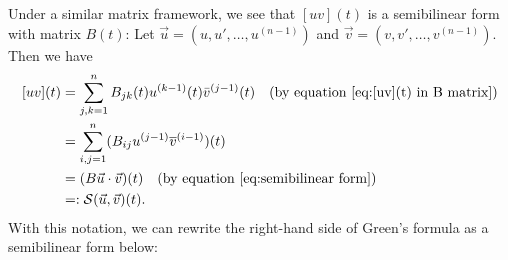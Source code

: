 \documentclass[11pt, oneside, a4paper]{article}
\begin{document}
Under a similar matrix framework, we see that $[uv](t)$ is a semibilinear form with matrix $B(t)$: Let $\vec{u}=(u, u', \ldots, u^{(n-1)})$ and $\vec{v}=(v, v', \ldots, v^{(n-1)})$. Then we have
\begin{equation}\label{[uv](t) in semibilinear form}
    \begin{split}
    [uv](t) &= \sum_{j,k=1}^n B_{jk}(t)u^{(k-1)}(t)\bar{v}^{(j-1)}(t)\quad\mbox{(by equation \eqref{eq:[uv](t) in B matrix})}\\
    &= \sum_{i,j=1}^n (B_{ij}u^{(j-1)}\overline{v}^{(i-1)})(t)\\
    &= (B\vec{u}\cdot \vec{v})(t)\quad\mbox{(by equation \eqref{eq:semibilinear form})}\\
    &=: \mathcal{S}(\vec{u},\vec{v})(t).
    \end{split}
\end{equation}
With this notation, we can rewrite the right-hand side of Green's formula as a semibilinear form below:
\end{document}
